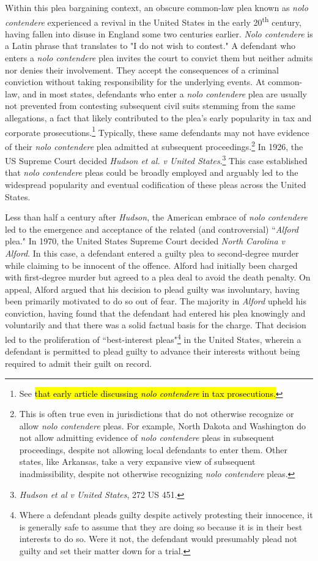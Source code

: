 Within this plea bargaining context, an obscure common-law plea known as \textit{nolo contendere} experienced a revival in the United States in the early 20\textsuperscript{th} century, having fallen into disuse in England some two centuries earlier. \textit{Nolo contendere} is a Latin phrase that translates to "I do not wish to contest." A defendant who enters a \textit{nolo contendere} plea invites the court to convict them but neither admits nor denies their involvement. They accept the consequences of a criminal conviction without taking responsibility for the underlying events. At common-law, and in most states, defendants who enter a \textit{nolo contendere} plea are usually not prevented from contesting subsequent civil suits stemming from the same allegations, a fact that likely contributed to the plea's early popularity in tax and corporate prosecutions.\footnote{See \hl{that early article discussing \textit{nolo contendere} in tax prosecutions.}} Typically, these same defendants may not have evidence of their \textit{nolo contendere} plea admitted at subsequent proceedings.\footnote{This is often true even in jurisdictions that do not otherwise recognize or allow \textit{nolo contendere} pleas. For example, North Dakota and Washington do not allow admitting evidence of \textit{nolo contendere} pleas in subsequent proceedings, despite not allowing local defendants to enter them. Other states, like Arkansas, take a very expansive view of subsequent inadmissibility, despite not otherwise recognizing \textit{nolo contendere} pleas.} In 1926, the US Supreme Court decided \textit{Hudson et al. v United States}.\footnote{\textit{Hudson et al v United States}, 272 US 451.} This case established that \textit{nolo contendere} pleas could be broadly employed and arguably led to the widespread popularity and eventual codification of these pleas across the United States.

Less than half a century after \textit{Hudson}, the American embrace of \textit{nolo contendere} led to the emergence and acceptance of the related (and controversial) ``\textit{Alford} plea." In 1970, the United States Supreme Court decided \textit{North Carolina v Alford}. In this case, a defendant entered a guilty plea to second-degree murder while claiming to be innocent of the offence. Alford had initially been charged with first-degree murder but agreed to a plea deal to avoid the death penalty. On appeal, Alford argued that his decision to plead guilty was involuntary, having been primarily motivated to do so out of fear. The majority in \textit{Alford} upheld his conviction, having found that the defendant had entered his plea knowingly and voluntarily and that there was a solid factual basis for the charge. That decision led to the proliferation of ``best-interest pleas"\footnote{Where a defendant pleads guilty despite actively protesting their innocence, it is generally safe to assume that they are doing so because it is in their best interests to do so. Were it not, the defendant would presumably plead not guilty and set their matter down for a trial.} in the United States, wherein a defendant is permitted to plead guilty to advance their interests without being required to admit their guilt on record. 

